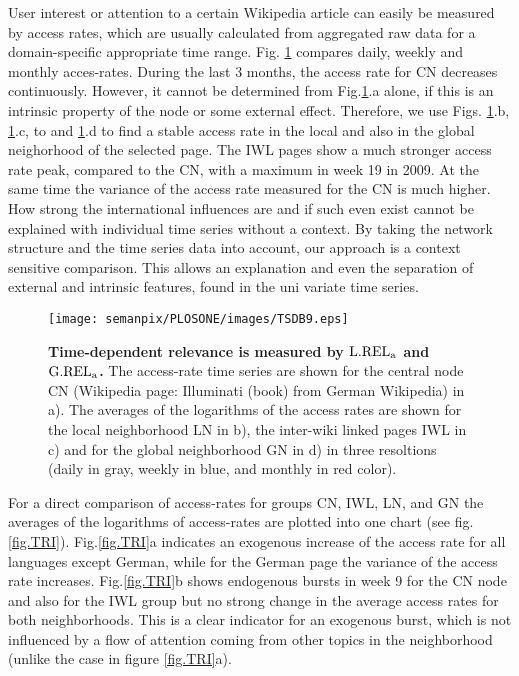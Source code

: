 \documentclass[a4paper,10pt]{scrbook}
\begin{document}
User interest or attention to a certain Wikipedia article can easily be measured
by access rates, which are usually calculated from aggregated raw data for a
domain-specific appropriate time range. Fig. \ref{fig.TSDB} compares daily,
weekly and monthly acces-rates. During the last 3 months, the access rate for
CN decreases continuously. However, it cannot be determined from Fig.\ref{fig.TSDB}.a 
alone, if this is an intrinsic property of the node or some
external effect. Therefore, we use Figs. \ref{fig.TSDB}.b, \ref{fig.TSDB}.c, to and \ref{fig.TSDB}.d to 
find a stable access rate in the local and also in the global neighorhood of the selected page. The IWL pages
show a much stronger access rate peak, compared to the CN, with a
maximum in week 19 in 2009. At the same time the variance of the access rate
measured for the CN is much higher. How strong the international influences are and if such even exist cannot be 
explained with individual time series without a context. By taking the network structure and the time series data into account, our approach is a context sensitive comparison. This allows an explanation and even the separation of external and intrinsic
features, found in the uni variate time series. 
\begin{figure}[!h]
\begin{center}
\texttt{[image: semanpix/PLOSONE/images/TSDB9.eps]}
\end{center}
\caption{
{\bf Time-dependent relevance is measured by $\rm L.REL_a$ and $\rm G.REL_a$.}
The
access-rate time series are shown for the central node CN (Wikipedia page: Illuminati (book) from German Wikipedia) in a). The averages of
the logarithms of the access rates are shown for the local neighborhood LN in
b),
the inter-wiki linked pages IWL in c) and for the global neighborhood GN in d)
in
three resoltions (daily in gray, weekly in blue, and monthly in red color). }
\label{fig.TSDB}
\end{figure}

For a direct comparison of access-rates for groups CN, IWL, LN, and GN the
averages of the logarithms of access-rates are plotted into one chart (see
fig.\ref{fig.TRI}). Fig.\ref{fig.TRI}a indicates an exogenous increase of the
access rate for all languages except German, while for the German page the variance
of the access rate increases. Fig.\ref{fig.TRI}b shows endogenous bursts in
week 9 for the CN node and also for the IWL group but no strong change in the
average access rates for both neighborhoods. This is a clear indicator for an
exogenous burst, which is not influenced by a flow of attention coming from
other topics in the neighborhood (unlike the case in figure \ref{fig.TRI}a).
\end{document}
